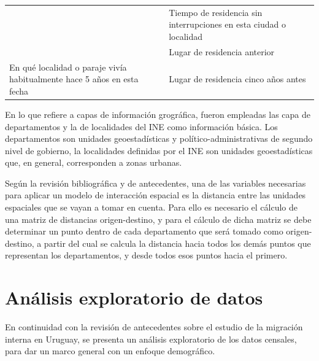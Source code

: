 \documentclass[12pt,spanish,]{article}
\begin{document}
\begin{longtable}[]{@{}ll@{}}
\begin{minipage}[t]{0.47\columnwidth}
\strut
\end{minipage} & \begin{minipage}[t]{0.47\columnwidth}\raggedright
Tiempo de residencia sin interrupciones en esta ciudad o localidad\strut
\end{minipage}\tabularnewline
\begin{minipage}[t]{0.47\columnwidth}\raggedright
\strut
\end{minipage} & \begin{minipage}[t]{0.47\columnwidth}\raggedright
Lugar de residencia anterior\strut
\end{minipage}\tabularnewline
\begin{minipage}[t]{0.47\columnwidth}\raggedright
En qué localidad o paraje vivía habitualmente hace 5 años en esta
fecha\strut
\end{minipage} & \begin{minipage}[t]{0.47\columnwidth}\raggedright
Lugar de residencia cinco años antes\strut
\end{minipage}\tabularnewline
\bottomrule
\end{longtable}

En lo que refiere a capas de información grográfica, fueron empleadas
las capa de departamentos y la de localidades del INE como información
básica. Los departamentos son unidades geoestadísticas y
político-administrativas de segundo nivel de gobierno, la localidades
definidas por el INE son unidades geoestadísticas que, en general,
corresponden a zonas urbanas.

Según la revisión bibliográfica y de antecedentes, una de las variables
necesarias para aplicar un modelo de interacción espacial es la
distancia entre las unidades espaciales que se vayan a tomar en cuenta.
Para ello es necesario el cálculo de una matriz de distancias
origen-destino, y para el cálculo de dicha matriz se debe determinar un
punto dentro de cada departamento que será tomado como origen-destino, a
partir del cual se calcula la distancia hacia todos los demás puntos que
representan los departamentos, y desde todos esos puntos hacia el
primero.

\newpage

\hypertarget{anuxe1lisis-exploratorio-de-datos}{%
\section{Análisis exploratorio de
datos}\label{anuxe1lisis-exploratorio-de-datos}}

En continuidad con la revisión de antecedentes sobre el estudio de la
migración interna en Uruguay, se presenta un análisis exploratorio de
los datos censales, para dar un marco general con un enfoque
demográfico.
\end{document}
